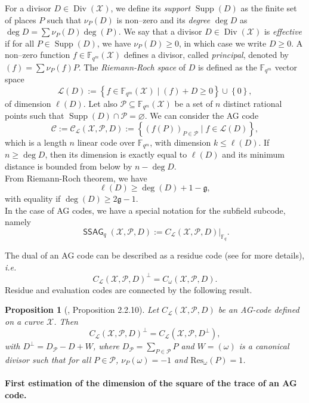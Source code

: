 \documentclass[a4paper]{article}
\newtheorem{proposition}[thm]{Proposition}
\theoremstyle{definition}
\theoremstyle{remark}
\newcommand{\calP}{\mathcal{P}}
\newcommand{\calL}{\mathcal{L}}
\newcommand{\calC}{\mathcal{C}}
\newcommand{\calX}{\mathcal{X}}
\newcommand{\fqm}{\mathbb{F}_{q^m}}
\newcommand{\fq}{\mathbb{F}_{q}}
\newcommand{\set}[1]{\left\{#1\right\}}
\newcommand{\Supp}{\operatorname{Supp}}
\newcommand{\Div}{\operatorname{Div}}
\newcommand{\ssag}[1]{\operatorname{\mathsf{SSAG}}_{q}\left(#1\right)}
\begin{document}
For a divisor $D \in \Div(\calX)$, we define its \emph{support} $\Supp(D)$ as the finite set of places $P$ such that $\nu_P(D)$ is non--zero and its \emph{degree} $\deg D$ as $\deg D=\sum \nu_P(D) \deg(P)$. We say that a divisor $D \in \Div(\calX)$ is \emph{effective} if for all $P \in \Supp(D)$, we have $\nu_P(D) \geq 0$, in which case we write $D \geq 0$.
A non--zero function $f \in \fqm(\calX)$ defines a divisor, called \emph{principal}, denoted by $(f)=\sum \nu_P(f) P$. The \emph{Riemann-Roch space} of $D$ is defined as the $\fqm$ vector space
$$ \calL(D) := \set{f \in \fqm(\calX) \mid (f) + D \geq 0} \cup \set{0},$$
of dimension $\ell(D)$.
Let also $\calP \subseteq \fqm(\calX)$ be a set of $n$ distinct rational points such that $\Supp(D) \cap \calP = \varnothing$.
We can consider the AG code 
$$\calC := \calC_{\calL}(\calX,\calP,D) := \set{\left(f(P)\right)_{P \in \calP} \mid f \in \calL(D)},$$
which is a length $n$ linear code over $\fqm$, with dimension $k \leq \ell(D)$. If $n \geq \deg D$, then its dimension is exactly equal to $\ell(D)$ and its minimum distance is bounded from below by $n-\deg D$.\\
From Riemann-Roch theorem, we have
$$ \ell(D) \geq \deg(D) +1 - \mathfrak{g},$$ 
with equality if $\deg(D) \geq 2\mathfrak{g}-1$.\\
In the case of AG codes, we have a special notation for the subfield subcode, namely
\[\ssag{\calX,\calP,D} := C_{\calL}(\calX,\calP,D)|_{\fq}.\]

The dual of an AG code can be described as a residue code (see \cite{Sti09} for more details), \emph{i.e.}
$$ C_{\calL}(\calX,\calP,D)^{\perp} = C_{\omega}(\calX,\calP,D).$$ 
Residue and evaluation codes are connected by the following result.

\begin{proposition} [\cite{Sti09}, Proposition 2.2.10] \label{prop:dual_AG_codes}
Let $C_{\calL}(\calX,\calP,D)$ be an AG-code defined on a curve $\calX$. Then 
\[C_{\calL}(\calX,\calP,D)^{\perp} = C_{\calL}(\calX,\calP,D^{\perp}),\]
with $D^{\perp} = D_{\calP}-D+W$, where $D_{\calP} = \sum\limits_{P \in \calP} P$ and $W=(\omega)$ is a canonical divisor such that for all $P \in \calP$, $\nu_P(\omega)=-1$ and $\mathrm{Res}_{\omega}(P)=1$. 
\end{proposition}


\paragraph{First estimation of the dimension of the square of the trace of an AG code.}
\end{document}
